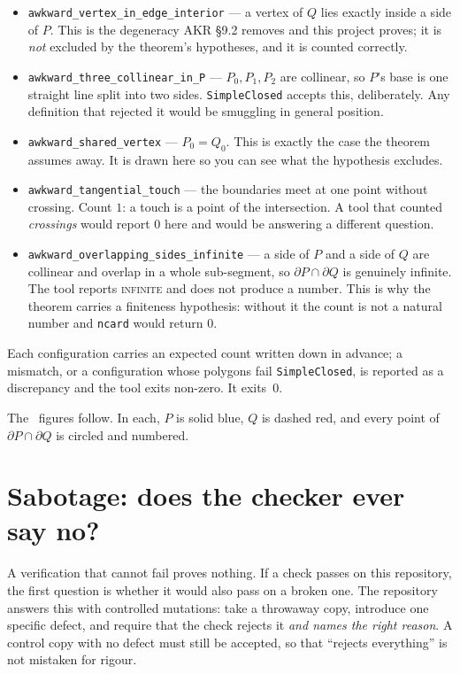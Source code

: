 \documentclass[11pt]{article}
\newcommand{\code}[1]{\texttt{\small #1}}
\begin{document}
\begin{itemize}
\item \code{awkward\_vertex\_in\_edge\_interior} --- a vertex of $Q$ lies
  exactly inside a side of $P$. This is the degeneracy AKR \S9.2 removes and
  this project proves; it is \emph{not} excluded by the theorem's hypotheses,
  and it is counted correctly.
\item \code{awkward\_three\_collinear\_in\_P} --- $P_0,P_1,P_2$ are collinear,
  so $P$'s base is one straight line split into two sides. \code{SimpleClosed}
  accepts this, deliberately. Any definition that rejected it would be smuggling
  in general position.
\item \code{awkward\_shared\_vertex} --- $P_0=Q_0$. This is exactly the case the
  theorem assumes away. It is drawn here so you can see what the hypothesis
  excludes.
\item \code{awkward\_tangential\_touch} --- the boundaries meet at one point
  without crossing. Count $1$: a touch is a point of the intersection. A tool
  that counted \emph{crossings} would report $0$ here and would be answering a
  different question.
\item \code{awkward\_overlapping\_sides\_infinite} --- a side of $P$ and a side
  of $Q$ are collinear and overlap in a whole sub-segment, so
  $\partial P\cap\partial Q$ is genuinely infinite. The tool reports
  \textsc{infinite} and does not produce a number. This is why the theorem
  carries a finiteness hypothesis: without it
  the count is not a natural number and \code{ncard} would return $0$.
\end{itemize}

Each configuration carries an expected count written down in advance; a
mismatch, or a configuration whose polygons fail \code{SimpleClosed}, is
reported as a discrepancy and the tool exits non-zero. It exits~$0$.

\smallskip
\noindent The \galcount\ figures follow. In each, $P$ is solid blue, $Q$ is
dashed red, and every point of $\partial P\cap\partial Q$ is circled and
numbered.



\section{Sabotage: does the checker ever say no?}

A verification that cannot fail proves nothing. If a check passes on this
repository, the first question is whether it would also pass on a broken one.
The repository answers this with controlled mutations: take a throwaway copy,
introduce one specific defect, and require that the check rejects it \emph{and
names the right reason}. A control copy with no defect must still be accepted,
so that ``rejects everything'' is not mistaken for rigour.
\end{document}
